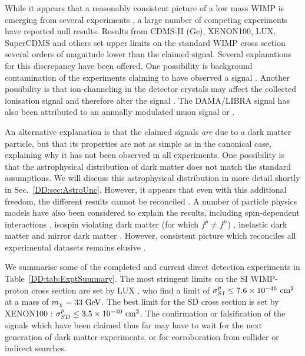 While it appears that a reasonably consistent picture of a low mass WIMP is emerging from several experiments \cite{Hooper:2010}, a large number of competing experiments have reported null results. Results from CDMS-II (Ge), XENON100, LUX, SuperCDMS \cite{Agnese:2014} and others set upper limits on the standard WIMP cross section several orders of magnitude lower than the claimed signal. Several explanations for this discrepancy have been offered. One possibility is background contamination of the experiments claiming to have observed a signal \cite{Kuzniak:2012}. Another possibility is that ion-channeling in the detector crystals may affect the collected ionisation signal and therefore alter the signal \cite{Bozorgnia:2010}. The DAMA/LIBRA signal has also been attributed to an annually modulated muon signal \cite{Blum:2011,Bernabei:2012} or .

An alternative explanation is that the claimed signals \textit{are} due to a dark matter particle, but that its properties are not as simple as in the canonical case, explaining why it has not been observed in all experiments. One possibility is that the astrophysical distribution of dark matter does not match the standard assumptions. We will discuss this astrophysical distribution in more detail shortly in Sec.~\ref{DD:sec:AstroUnc}. However, it appears that even with this additional freedom, the different results cannot be reconciled . A number of particle physics models have also been considered to explain the results, including spin-dependent interactions \cite{Buckley:2013}, isospin violating dark matter (for which $f^p \neq f^n$) \cite{Feng:2011}, inelastic dark matter \cite{Smith:2001} and mirror dark matter \cite{Foot:2013}. However, consistent picture which reconciles all experimental datasets remains elusive \cite{Schwetz:2011}. 

We summarise some of the completed and current direct detection experiments in Table~\ref{DD:tab:ExptSummary}. The most stringent limits on the SI WIMP-proton cross section are set by LUX \cite{Akerib:2014}, who find a limit of $\sigma_{SI}^p \leq 7.6 \times 10^{-46} \textrm{ cm}^2$ at a mass of $m_\chi = 33 \textrm{ GeV}$. The best limit for the SD cross section is set by XENON100 \cite{Aprile:2013c}: $\sigma_{SD}^p \leq 3.5 \times 10^{-40} \textrm{ cm}^2$. The confirmation or falsification of the signals which have been claimed thus far may have to wait for the next generation of dark matter experiments, or for corroboration from collider or indirect searches. 

